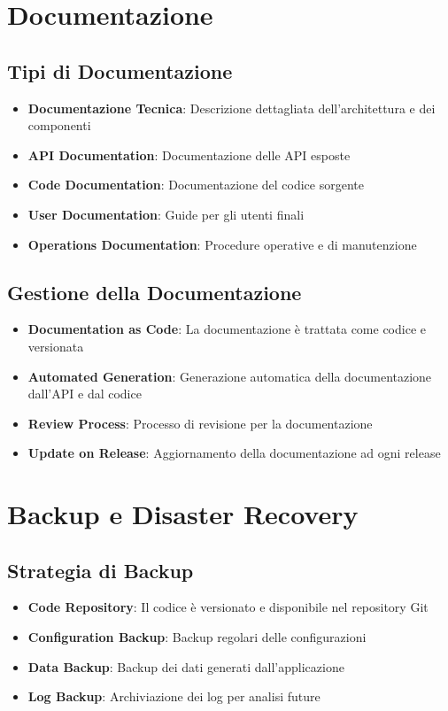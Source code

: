 \section{Documentazione}

\subsection{Tipi di Documentazione}
\begin{itemize}
    \item \textbf{Documentazione Tecnica}: Descrizione dettagliata dell'architettura e dei componenti
    \item \textbf{API Documentation}: Documentazione delle API esposte
    \item \textbf{Code Documentation}: Documentazione del codice sorgente
    \item \textbf{User Documentation}: Guide per gli utenti finali
    \item \textbf{Operations Documentation}: Procedure operative e di manutenzione
\end{itemize}

\subsection{Gestione della Documentazione}
\begin{itemize}
    \item \textbf{Documentation as Code}: La documentazione è trattata come codice e versionata
    \item \textbf{Automated Generation}: Generazione automatica della documentazione dall'API e dal codice
    \item \textbf{Review Process}: Processo di revisione per la documentazione
    \item \textbf{Update on Release}: Aggiornamento della documentazione ad ogni release
\end{itemize}

\section{Backup e Disaster Recovery}

\subsection{Strategia di Backup}
\begin{itemize}
    \item \textbf{Code Repository}: Il codice è versionato e disponibile nel repository Git
    \item \textbf{Configuration Backup}: Backup regolari delle configurazioni
    \item \textbf{Data Backup}: Backup dei dati generati dall'applicazione
    \item \textbf{Log Backup}: Archiviazione dei log per analisi future
\end{itemize}

